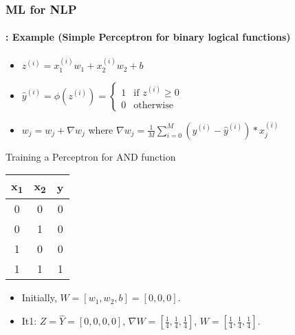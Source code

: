 \documentclass[xcolor=table]{beamer}
\begin{document}
	\begin{frame}
		\frametitle{ML for NLP}
		\framesubtitle{\insertsection: Example (Simple Perceptron for binary logical functions)}
		
		\begin{minipage}{0.30\textwidth} 
		\end{minipage}
		\begin{minipage}{0.59\textwidth}
			\scriptsize
			\begin{itemize}
				\item $ z^{(i)} = x_1^{(i)} w_1 + x_2^{(i)} w_2 + b $
				\item $ \hat{y}^{(i)} = \phi(z^{(i)}) = \begin{cases}
					1 & \text{if } z^{(i)} \ge 0 \\
					0 & \text{otherwise}
				\end{cases} $
				\item $ w_j = w_j + \nabla w_j$ where $ \nabla w_j = \frac{1}{M}\sum_{i=0}^{M} (y^{(i)} - \hat{y}^{(i)}) * x_j^{(i)} $
			\end{itemize}
		\end{minipage}
	
		\vfill
	
		\begin{exampleblock}{Training a Perceptron for AND function}
			\begin{minipage}{0.2\textwidth} 
				\scriptsize
				\begin{tabular}{|c|c|c|}
					\hline
					x\textsubscript{1} & x\textsubscript{2} & y \\
					\hline
					0 & 0 & 0  \\
					\hline
					0 & 1 & 0 \\
					\hline
					1 & 0 & 0 \\
					\hline
					1 & 1 & 1 \\
					\hline
				\end{tabular}
			\end{minipage}
			\begin{minipage}{0.79\textwidth}
				\scriptsize
				\begin{itemize}
					\item Initially, $ W = [w_1, w_2, b] = [0, 0, 0] $.
					
					\item It1: $ Z = \hat{Y} = [0, 0, 0, 0] $, 
					$ \nabla W = [\frac{1}{4}, \frac{1}{4}, \frac{1}{4}] $, 
					$ W = [\frac{1}{4}, \frac{1}{4}, \frac{1}{4}] $.
					

\end{itemize}
\end{minipage}
\end{exampleblock}
\end{frame}
\end{document}

